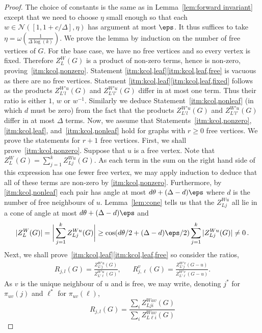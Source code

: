 \begin{proof}
The choice of constants is the same as in Lemma~\ref{lem:forward invariant} except that we need to choose $\eta$ small enough so that each $w\in \mathcal{N}([1,1+c/\Delta],\eta)$ has argument at most $\eps$. It thus suffices to take $\eta=\omega(\frac{1}{\Delta\log(k)})$.
%
We prove the lemma by induction on the number of free vertices of $G$.
For the base case, we have no free vertices and so every vertex is fixed.
Therefore $Z_L^W(G)$ is a product of non-zero terms, hence is non-zero, proving~\ref{itm:kcol,nonzero}.
Statement \ref{itm:kcol,leaf}\ref{itm:kcol,leaf,free} is vacuous as there are no free vertices.
Statement \ref{itm:kcol,leaf}\ref{itm:kcol,leaf,fixed} follows as the products $Z_{L'l}^{W'u}(G)$ and $Z_{L'l'}^{W'u}(G)$ differ in at most one term.
Thus their ratio is either $1$, $w$ or $w^{-1}$.
Similarly we deduce Statement~\ref{itm:kcol,nonleaf} (in which $d$ must be zero) from the fact that the products $Z_{L'l}^{W'u}(G)$ and $Z_{L'l'}^{W'u}(G)$ differ in at most $\Delta$ terms.
%
Now, we assume that Statements~\ref{itm:kcol,nonzero}, \ref{itm:kcol,leaf}, and~\ref{itm:kcol,nonleaf} hold for graphs with $r \ge 0$ free vertices. We prove the statements for $r+1$ free vertices. First, we shall prove~\ref{itm:kcol,nonzero}.
%
Suppose that $u$ is a free vertex.
Note that $Z_L^W(G) = \sum_{j=1}^k Z_{Lj}^{Wu}(G)$.
As each term in the sum on the right hand side of this expression has one fewer free vertex, we may apply induction to deduce that all of these terms are non-zero by \ref{itm:kcol,nonzero}.
Furthermore, by \ref{itm:kcol,nonleaf} each pair has angle at most $d\theta +(\Delta-d)\eps$ where $d$ is the number of free neighbours of $u$.
Lemma~\ref{lem:cone} tells us that the $Z_{Lj}^{Wu}$ all lie in a cone of angle at most $d\theta+(\Delta-d)\eps$ and
\begin{equation*}
 |Z_L^W(G)| = \bigg|\sum_{j=1}^k Z_{Lj}^{Wu}(G) \bigg| \geq \cos(d\theta/2+(\Delta-d)\eps/2)\sum_{j=1}^k |Z_{Lj}^{Wu}(G)| \neq 0\,.
\end{equation*}
%
Next, we shall prove~\ref{itm:kcol,leaf}\ref{itm:kcol,leaf,free} so consider the ratios,
\begin{align*}
 R_{j,l}(G) = \frac{Z_{L'j}^{W'u}(G)}{Z_{L'\ell}^{W'u}(G)}, & & R_{j,\ell}^v(G) = \frac{Z_{L'j}^{W'v}(G- u)}{Z_{L'\ell}^{W'v}(G - u)}.
\end{align*}
As $v$ is the unique neighbour of $u$ and is free, we may write, denoting $j^*$ for $\pi_{uv}(j)$ and $\ell^*$ for $\pi_{uv}(\ell)$,
\[
 R_{j,l}(G) = \frac{\sum_{i}Z^{Wuv}_{Lji}(G)}{\sum_{i}Z^{Wuv}_{L\ell i}(G)}
\]
\end{proof}
